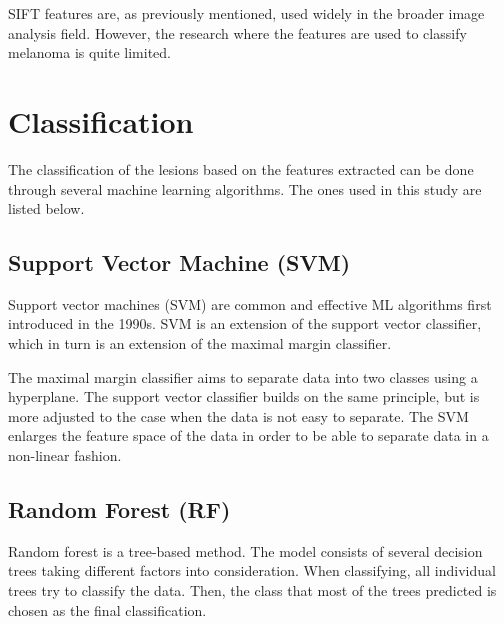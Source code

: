 \documentclass{kththesis}
\begin{document}
SIFT features are, as previously mentioned, used widely in the broader image analysis field. However, the research where the features are used to classify melanoma is quite limited.

\section{Classification}

The classification of the lesions based on the features extracted can be done through several machine learning algorithms. The ones used in this study are listed below.

\subsection{Support Vector Machine (SVM)}

Support vector machines (SVM) are common and effective ML algorithms first introduced in the 1990s. SVM is an extension of the support vector classifier, which in turn is an extension of the maximal margin classifier.

The maximal margin classifier aims to separate data into two classes using a hyperplane. The support vector classifier builds on the same principle, but is more adjusted to the case when the data is not easy to separate. The SVM enlarges the feature space of the data in order to be able to separate data in a non-linear fashion. \parencite{james2013introduction}




\subsection{Random Forest (RF)}

Random forest is a tree-based method. The model consists of several decision trees taking different factors into consideration. When classifying, all individual trees try to classify the data. Then, the class that most of the trees predicted is chosen as the final classification.
\end{document}
